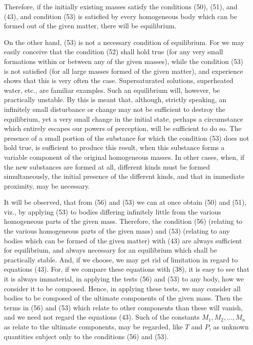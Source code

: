 \documentclass[11pt]{article}
\begin{document}
Therefore, if the initially existing masses satisfy the conditions (50), (51), and (43), and condition (53) is satisfied by every homogeneous body which can be formed out of the given matter, there will be equilibrium.

On the other hand, (53) is not a necessary condition of equilibrium. For we may easily conceive that the condition (52) shall hold true (for any very small formations within or between any of the given masses), while the condition (53) is not satisfied (for all large masses formed of the given matter), and experience shows that this is very often the case. Supersaturated solutions, superheated water, etc., are familiar examples. Such an equilibrium will, however, be practically unstable. By this is meant that, although, strictly speaking, an infinitely small disturbance or change may not be sufficient to destroy the equilibrium, yet a very small change in the initial state, perhaps a circumstance which entirely escapes our powers of perception, will be sufficient to do so. The presence of a small portion of the substance for which the condition (53) does not hold true, is sufficient to produce this result, when this substance forms a variable component of the original homogeneous masses. In other cases, when, if the new substances are formed at all, different kinds must be formed simultaneously, the initial presence of the different kinds, and that in immediate proximity, may be necessary.

It will be observed, that from (56) and (53) we can at once obtain (50) and (51), viz., by applying (53) to bodies differing infinitely little from the various homogeneous parts of the given mass. Therefore, the condition (56) (relating to the various homogeneous parts of the given mass) and (53) (relating to any bodies which can be formed of the given matter) with (43) are always sufficient for equilibrium, and always necessary for an equilibrium which shall be practically stable. And, if we choose, we may get rid of limitation in regard to equations (43). For, if we compare these equations with (38), it is easy to see that it is always immaterial, in applying the tests (56) and (53) to any body, how we consider it to be composed. Hence, in applying these tests, we may consider all bodies to be composed of the ultimate components of the given mass. Then the terms in (56) and (53) which relate to other components than these will vanish, and we need not regard the equations (43). Such of the constants \(M_1,M_2,\ldots,M_n\) as relate to the ultimate components, may be regarded, like \(T\) and \(P\), as unknown quantities subject only to the conditions (56) and (53).
\end{document}
